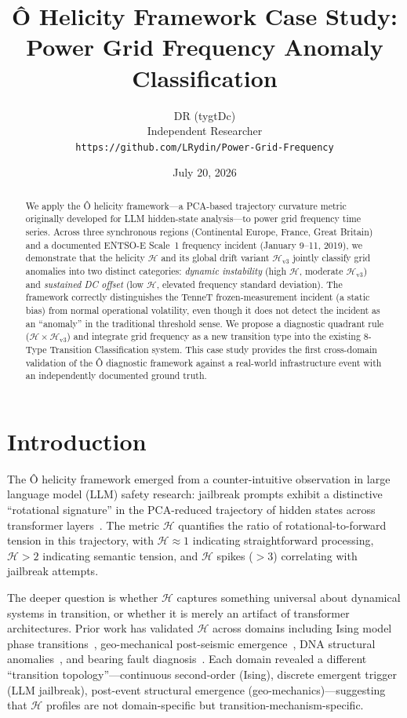 \documentclass[11pt,a4paper]{article}
\title{\textbf{Ô Helicity Framework Case Study:\\Power Grid Frequency Anomaly Classification}}
\author{DR (tygtDc)\\Independent Researcher\\\texttt{https://github.com/LRydin/Power-Grid-Frequency}}
\date{July 20, 2026}
\begin{document}
\maketitle

\begin{abstract}
We apply the Ô helicity framework—a PCA-based trajectory curvature metric originally developed for LLM hidden-state analysis—to power grid frequency time series. Across three synchronous regions (Continental Europe, France, Great Britain) and a documented ENTSO-E Scale~1 frequency incident (January 9--11, 2019), we demonstrate that the helicity $\mathcal{H}$ and its global drift variant $\mathcal{H}_{\text{v3}}$ jointly classify grid anomalies into two distinct categories: \emph{dynamic instability} (high $\mathcal{H}$, moderate $\mathcal{H}_{\text{v3}}$) and \emph{sustained DC offset} (low $\mathcal{H}$, elevated frequency standard deviation). The framework correctly distinguishes the TenneT frozen-measurement incident (a static bias) from normal operational volatility, even though it does not detect the incident as an ``anomaly'' in the traditional threshold sense. We propose a diagnostic quadrant rule ($\mathcal{H} \times \mathcal{H}_{\text{v3}}$) and integrate grid frequency as a new transition type into the existing 8-Type Transition Classification system. This case study provides the first cross-domain validation of the Ô diagnostic framework against a real-world infrastructure event with an independently documented ground truth.
\end{abstract}

\section{Introduction}

The Ô helicity framework emerged from a counter-intuitive observation in large language model (LLM) safety research: jailbreak prompts exhibit a distinctive ``rotational signature'' in the PCA-reduced trajectory of hidden states across transformer layers~\cite{semantic_helicity}. The metric $\mathcal{H}$ quantifies the ratio of rotational-to-forward tension in this trajectory, with $\mathcal{H} \approx 1$ indicating straightforward processing, $\mathcal{H} > 2$ indicating semantic tension, and $\mathcal{H}$ spikes ($>3$) correlating with jailbreak attempts.

The deeper question is whether $\mathcal{H}$ captures something universal about dynamical systems in transition, or whether it is merely an artifact of transformer architectures. Prior work has validated $\mathcal{H}$ across domains including Ising model phase transitions~\cite{ising_helicity}, geo-mechanical post-seismic emergence~\cite{creepmeter}, DNA structural anomalies~\cite{dna_stacking}, and bearing fault diagnosis~\cite{bearing_fault}. Each domain revealed a different ``transition topology''—continuous second-order (Ising), discrete emergent trigger (LLM jailbreak), post-event structural emergence (geo-mechanics)—suggesting that $\mathcal{H}$ profiles are not domain-specific but transition-mechanism-specific.
\end{document}
